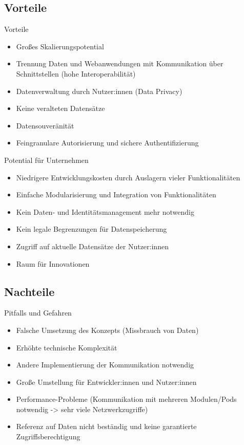 \documentclass{beamer}              %
\begin{document}
\subsection{Vorteile}
\begin{frame}{Vorteile}
\begin{itemize}
    \item Großes Skalierungspotential \cite{8633673}
    \item Trennung Daten und Webanwendungen mit Kommunikation über Schnittstellen (hohe Interoperabilität) \cite{8633673}
    \item Datenverwaltung durch Nutzer:innen (Data Privacy) \cite{yeung2023decentralization} 
    \item Keine veralteten Datensätze \cite{MarcoNeumann.2021}
    \item Datensouveränität
    \item Feingranulare Autorisierung und sichere Authentifizierung \cite{acp.2022}
\end{itemize}
\end{frame}

\begin{frame}{Potential für Unternehmen}
\begin{itemize}
    \item Niedrigere Entwicklungskosten durch Auslagern vieler Funktionalitäten 
    \item Einfache Modularisierung und Integration von Funktionalitäten
    \item Kein Daten- und Identitätsmanagement mehr notwendig
    \item Kein legale Begrenzungen für Datenspeicherung \cite{MarcoNeumann.2021}
    \item Zugriff auf aktuelle Datensätze der Nutzer:innen \cite{MarcoNeumann.2021}
    \item Raum für Innovationen \cite{MarcoNeumann.2021}
\end{itemize}
\end{frame}


\subsection{Nachteile}
\begin{frame}{Pitfalls und Gefahren}
\begin{itemize}
    \item Falsche Umsetzung des Konzepts (Missbrauch von Daten) \cite{MarcoNeumann.2021}
    \item Erhöhte technische Komplexität \cite{MarcoNeumann.2021}
    \item Andere Implementierung der Kommunikation notwendig \cite{MarcoNeumann.2021}
    \item Große Umstellung für Entwickler:innen und Nutzer:innen \cite{MarcoNeumann.2021}
    \item Performance-Probleme (Kommunikation mit mehreren Modulen/Pods notwendig -> sehr viele Netzwerkzugriffe) \cite{MarcoNeumann.2021}
    \item Referenz auf Daten nicht beständig und keine garantierte Zugriffsberechtigung
\end{itemize}
\end{frame}
\end{document}
